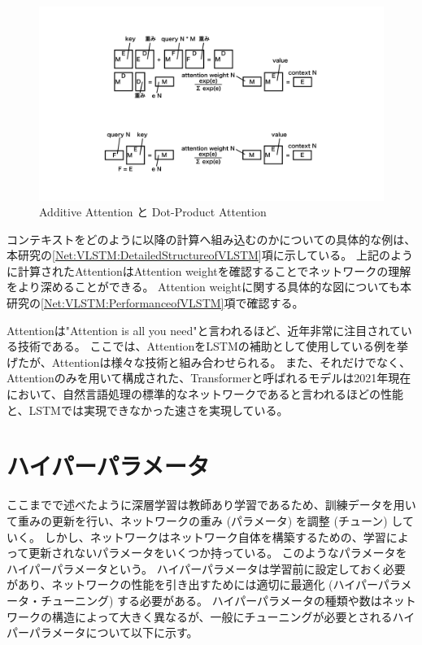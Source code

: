 \begin{figure}[htbp]
 \centering
 \includegraphics[trim = 200 100 200 100, width=1.0\textwidth, clip]{Figure/2DeepLearning/20Attention.png}
 \caption{Additive Attention と Dot-Product Attention}
 \label{20Attention}
\end{figure}

コンテキストをどのように以降の計算へ組み込むのかについての具体的な例は、本研究の\ref{Net:VLSTM:DetailedStructureofVLSTM}項に示している。
上記のように計算されたAttentionはAttention weightを確認することでネットワークの理解をより深めることができる。
Attention weightに関する具体的な図についても本研究の\ref{Net:VLSTM:PerformanceofVLSTM}項で確認する。

Attentionは"Attention is all you need\cite{AttentionIsAllYouNeed}"と言われるほど、近年非常に注目されている技術である。
ここでは、AttentionをLSTMの補助として使用している例を挙げたが、Attentionは様々な技術と組み合わせられる。
また、それだけでなく、Attentionのみを用いて構成された、Transformerと呼ばれるモデルは2021年現在において、自然言語処理の標準的なネットワークであると言われるほどの性能と、LSTMでは実現できなかった速さを実現している。


\section{ハイパーパラメータ} \label{DL:HyperParameter}

ここまでで述べたように深層学習は教師あり学習であるため、訓練データを用いて重みの更新を行い、ネットワークの重み (パラメータ) を調整 (チューン) していく。
しかし、ネットワークはネットワーク自体を構築するための、学習によって更新されないパラメータをいくつか持っている。
このようなパラメータをハイパーパラメータという。
ハイパーパラメータは学習前に設定しておく必要があり、ネットワークの性能を引き出すためには適切に最適化 (ハイパーパラメータ・チューニング) する必要がある。
ハイパーパラメータの種類や数はネットワークの構造によって大きく異なるが、一般にチューニングが必要とされるハイパーパラメータについて以下に示す。

